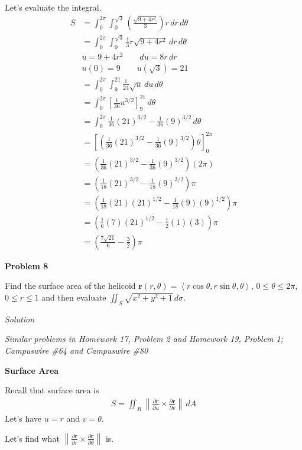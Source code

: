 \documentclass{article}
\newcommand{\lrp}[1]{\left( #1 \right)}
\newcommand{\lra}[1]{\left\langle #1 \right\rangle}
\newcommand{\lrb}[1]{\left[ #1 \right]}
\newcommand{\norm}[1]{\left\lVert #1 \right\rVert}
\renewcommand{\r}[0]{\mathbf{r}}
\newcommand{\Solution}{\textit{Solution}}
\begin{document}
Let's evaluate the integral.
\begin{align*}
    S&=\int_0^{2\pi}\int_0^{\sqrt{3}} \lrp{\frac{\sqrt{9+4r^2}}{3}}r\,dr\,d\theta\tag{don't forget our Jacobian $r$!}\\
    &=\int_0^{2\pi}\int_0^{\sqrt{3}}\frac{1}{3}r\sqrt{9+4r^2}\,dr\,d\theta\\
    &u=9+4r^2\hspace{2em}du=8r\,dr\\
    &u(0)=9\hspace{2em}u(\sqrt{3})=21\\
    &=\int_0^{2\pi}\int_9^{21}\frac{1}{24}\sqrt{u}\,du\,d\theta\\
    &=\int_0^{2\pi}\lrb{\frac{1}{36}u^{3/2}}_9^{21}\,d\theta\\
    &=\int_0^{2\pi}\frac{1}{36}(21)^{3/2}-\frac{1}{36}(9)^{3/2}\,d\theta\\
    &=\lrb{\lrp{\frac{1}{36}(21)^{3/2}-\frac{1}{36}(9)^{3/2}}\theta}_0^{2\pi}\\
    &=\lrp{\frac{1}{36}(21)^{3/2}-\frac{1}{36}(9)^{3/2}}\lrp{2\pi}\\
    &=\lrp{\frac{1}{18}(21)^{3/2}-\frac{1}{18}(9)^{3/2}}\pi\\
    &=\lrp{\frac{1}{18}(21)(21)^{1/2}-\frac{1}{18}(9)(9)^{1/2}}\pi\\
    &=\lrp{\frac{1}{6}(7)(21)^{1/2}-\frac{1}{2}(1)(3)}\pi\\
    &=\boxed{\lrp{\frac{7\sqrt{21}}{6}-\frac{3}{2}}\pi}
\end{align*}
{}\textbf{Problem 8}

Find the surface area of the helicoid $\r(r,\theta)=\lra{r\cos\theta, r\sin\theta,\theta}$, $0\leq \theta\leq 2\pi$, $0\leq r\leq 1$ and then evaluate $\displaystyle\iint_S\sqrt{x^2+y^2+1}\,d\sigma$.

\Solution

\textit{Similar problems in Homework 17, Problem 2 and Homework 19, Problem 1; Campuswire \#64 and Campuswire \#80}

{}\textbf{Surface Area}

Recall that surface area is
\begin{align*}
    S=\iint_R \norm{\frac{\partial \r}{\partial u}\times \frac{\partial \r}{\partial v}}\,dA
\end{align*}
Let's have $u=r$ and $v=\theta$.

Let's find what $\displaystyle \norm{\frac{\partial \r}{\partial r}\times \frac{\partial \r}{\partial \theta}}$ is. 
\end{document}
